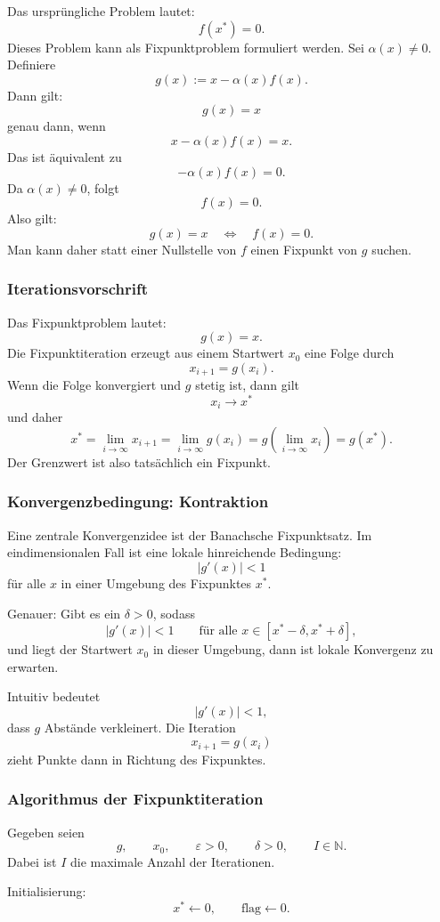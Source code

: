 \documentclass[10pt, letterpaper]{article}
\begin{document}
Das ursprüngliche Problem lautet:
\[
f(x^\ast)=0.
\]
Dieses Problem kann als Fixpunktproblem formuliert werden. Sei \(\alpha(x)\neq 0\). Definiere
\[
g(x):=x-\alpha(x)f(x).
\]
Dann gilt:
\[
g(x)=x
\]
genau dann, wenn
\[
x-\alpha(x)f(x)=x.
\]
Das ist äquivalent zu
\[
-\alpha(x)f(x)=0.
\]
Da \(\alpha(x)\neq 0\), folgt
\[
f(x)=0.
\]
Also gilt:
\[
\boxed{
g(x)=x
\quad\Longleftrightarrow\quad
f(x)=0.
}
\]
Man kann daher statt einer Nullstelle von \(f\) einen Fixpunkt von \(g\) suchen.

\subsubsection{Iterationsvorschrift}

Das Fixpunktproblem lautet:
\[
g(x)=x.
\]
Die Fixpunktiteration erzeugt aus einem Startwert \(x_0\) eine Folge durch
\[
\boxed{
x_{i+1}=g(x_i).
}
\]
Wenn die Folge konvergiert und \(g\) stetig ist, dann gilt
\[
x_i\to x^\ast
\]
und daher
\[
x^\ast
=
\lim_{i\to\infty}x_{i+1}
=
\lim_{i\to\infty}g(x_i)
=
g\left(\lim_{i\to\infty}x_i\right)
=
g(x^\ast).
\]
Der Grenzwert ist also tatsächlich ein Fixpunkt.

\subsubsection{Konvergenzbedingung: Kontraktion}

Eine zentrale Konvergenzidee ist der Banachsche Fixpunktsatz. Im eindimensionalen Fall ist eine lokale hinreichende Bedingung:
\[
|g'(x)|<1
\]
für alle \(x\) in einer Umgebung des Fixpunktes \(x^\ast\).

Genauer: Gibt es ein \(\delta>0\), sodass
\[
|g'(x)|<1
\qquad
\text{für alle }
x\in[x^\ast-\delta,x^\ast+\delta],
\]
und liegt der Startwert \(x_0\) in dieser Umgebung, dann ist lokale Konvergenz zu erwarten.

Intuitiv bedeutet
\[
|g'(x)|<1,
\]
dass \(g\) Abstände verkleinert. Die Iteration
\[
x_{i+1}=g(x_i)
\]
zieht Punkte dann in Richtung des Fixpunktes.

\subsubsection{Algorithmus der Fixpunktiteration}

Gegeben seien
\[
g,\qquad x_0,\qquad \varepsilon>0,\qquad \delta>0,\qquad I\in\mathbb{N}.
\]
Dabei ist \(I\) die maximale Anzahl der Iterationen.

Initialisierung:
\[
x^\ast\leftarrow 0,
\qquad
\text{flag}\leftarrow 0.
\]
\end{document}
